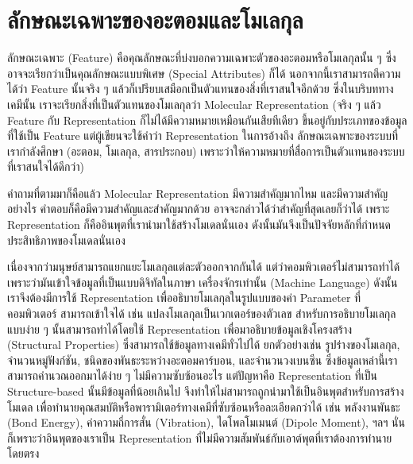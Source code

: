 

\chapter{ลักษณะเฉพาะของอะตอมและโมเลกุล}
\label{ch:feature}

ลักษณะเฉพาะ (Feature) คือคุณลักษณะที่บ่งบอกความเฉพาะตัวของอะตอมหรือโมเลกุลนั้น ๆ ซึ่งอาจจะเรียกว่าเป็นคุณลักษณะแบบพิเศษ 
(Special Attributes) ก็ได้ นอกจากนี้เราสามารถตีความได้ว่า Feature นั้นจริง ๆ แล้วก็เปรียบเสมือกเป็นตัวแทนของสิ่งที่เราสนใจอีกด้วย 
ซึ่งในบริบททางเคมีนั้น เราจะเรียกสิ่งที่เป็นตัวแทนของโมเลกุลว่า Molecular Representation (จริง ๆ แล้ว Feature กับ Representation 
ก็ไม่ได้มีความหมายเหมือนกันเสียทีเดียว ขึ้นอยู่กับประเภทของข้อมูลที่ใช้เป็น Feature แต่ผู้เขียนจะใช้คำว่า Representation ในการอ้างถึง%
ลักษณะเฉพาะของระบบที่เรากำลังศึกษา (อะตอม, โมเลกุล, สารประกอบ) เพราะว่าให้ความหมายที่สื่อการเป็นตัวแทนของระบบที่เราสนใจได้ดีกว่า)
\cite{stepisnik2021}

คำถามที่ตามมาก็คือแล้ว Molecular Representation มีความสำคัญมากไหม และมีความสำคัญอย่างไร คำตอบก็คือมีความสำคัญและสำคัญมากด้วย 
อาจจะกล่าวได้ว่าสำคัญที่สุดเลยก็ว่าได้ เพราะ Representation ก็คืออินพุตที่เรานำมาใช้สร้างโมเดลนั่นเอง ดังนั้นมันจึงเป็นปัจจัยหลักที่กำหนด%
ประสิทธิภาพของโมเดลนั่นเอง 

เนื่องจากว่ามนุษย์สามารถแยกแยะโมเลกุลแต่ละตัวออกจากกันได้ แต่ว่าคอมพิวเตอร์ไม่สามารถทำได้ เพราะว่ามันเข้าใจข้อมูลที่เป็นแบบดิจิทัลในภาษา%
เครื่องจักรเท่านั้น (Machine Language) ดังนั้นเราจึงต้องมีการใช้ Representation เพื่ออธิบายโมเลกุลในรูปแบบของค่า Parameter ที่คอมพิวเตอร์%
สามารถเข้าใจได้ เช่น แปลงโมเลกุลเป็นเวกเตอร์ของตัวเลข สำหรับการอธิบายโมเลกุลแบบง่าย ๆ นั้นสามารถทำได้โดยใช้ Representation 
เพื่อมาอธิบายข้อมูลเชิงโครงสร้าง (Structural Properties) ซึ่งสามารถใช้ข้อมูลทางเคมีทั่วไปได้ ยกตัวอย่างเช่น รูปร่างของโมเลกุล, 
จำนวนหมู่ฟังก์ชัน, ชนิดของพันธะระหว่างอะตอมคาร์บอน, และจำนวนวงเบนซีน ซึ่งข้อมูลเหล่านี้เราสามารถคำนวณออกมาได้ง่าย ๆ ไม่มีความซับซ้อนอะไร 
แต่ปัญหาคือ Representation ที่เป็น Structure-based นั้นมีข้อมูลที่น้อยเกินไป จึงทำให้ไม่สามารถถูกนำมาใช้เป็นอินพุตสำหรับการสร้างโมเดล
เพื่อทำนายคุณสมบัติหรือพารามิเตอร์ทางเคมีที่ซับซ้อนหรือละเอียดกว่าได้ เช่น พลังงานพันธะ (Bond Energy), ค่าความถี่การสั่น (Vibration), 
ไดโพลโมเมนต์ (Dipole Moment), ฯลฯ นั่นก็เพราะว่าอินพุตของเราเป็น Representation ที่ไม่มีความสัมพันธ์กับเอาต์พุตที่เราต้องการทำนายโดยตรง


